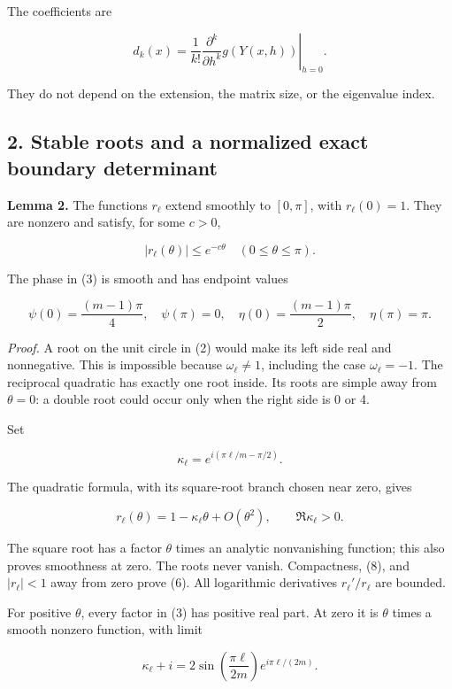 \documentclass[10pt,a4paper]{article}
\begin{document}
The coefficients are

\nopagebreak[3]
\[
d_k(x)=\frac{1}{k!}\left.\frac{\partial^k}{\partial h^k}g(Y(x,h))\right|_{h=0}.
\tag{5}
\]

They do not depend on the extension, the matrix size, or the eigenvalue index.

\subsection{2. Stable roots and a normalized exact boundary determinant}\label{stable-roots-and-a-normalized-exact-boundary-determinant}

\textbf{Lemma 2.} The functions \(r_\ell\) extend smoothly to \([0,\pi]\), with \(r_\ell(0)=1\). They are nonzero and satisfy, for some \(c>0\),

\nopagebreak[3]
\[
|r_\ell(\theta)|\le e^{-c\theta}\quad(0\le\theta\le\pi).
\tag{6}
\]

The phase in (3) is smooth and has endpoint values

\nopagebreak[3]
\[
\psi(0)=\frac{(m-1)\pi}{4},\quad \psi(\pi)=0,\quad
\eta(0)=\frac{(m-1)\pi}{2},\quad \eta(\pi)=\pi.
\tag{7}
\]

\emph{Proof.} A root on the unit circle in (2) would make its left side real and nonnegative. This is impossible because \(\omega_\ell\ne1\), including the case \(\omega_\ell=-1\). The reciprocal quadratic has exactly one root inside. Its roots are simple away from \(\theta=0\): a double root could occur only when the right side is 0 or 4.

Set

\nopagebreak[3]
\[
\kappa_\ell=e^{i(\pi\ell/m-\pi/2)}.
\]

The quadratic formula, with its square-root branch chosen near zero, gives

\nopagebreak[3]
\[
r_\ell(\theta)=1-\kappa_\ell\theta+O(\theta^2),\qquad
\Re\kappa_\ell>0.
\tag{8}
\]

The square root has a factor \(\theta\) times an analytic nonvanishing function; this also proves smoothness at zero. The roots never vanish. Compactness, (8), and \(|r_\ell|<1\) away from zero prove (6). All logarithmic derivatives \(r_\ell'/r_\ell\) are bounded.

For positive \(\theta\), every factor in (3) has positive real part. At zero it is \(\theta\) times a smooth nonzero function, with limit

\nopagebreak[3]
\[
\kappa_\ell+i
=2\sin\left(\frac{\pi\ell}{2m}\right)e^{i\pi\ell/(2m)}.
\]
\end{document}

